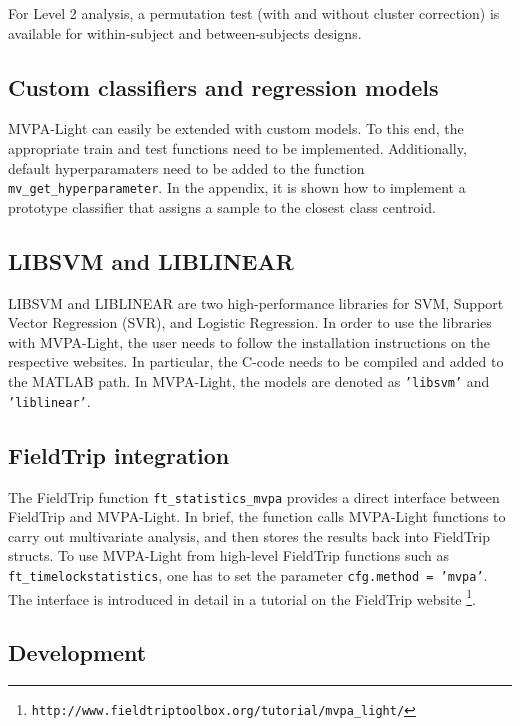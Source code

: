 \documentclass[utf8]{frontiersSCNS} %
\newcommand{\ttt}[1]{\texttt{#1}}
\begin{document}
For Level 2 analysis, a permutation test (with and without cluster correction) is available for within-subject and between-subjects designs.

\subsection{Custom classifiers and regression models}

MVPA-Light can easily be extended with custom models. To this end, the appropriate train and test functions need to be implemented. Additionally, default hyperparamaters need to be added to the function \ttt{mv\_get\_hyperparameter}. In the appendix, it is shown how to implement a prototype classifier that assigns a sample to the closest class centroid.

\subsection{LIBSVM and LIBLINEAR}\label{sec:libsvm}

LIBSVM \citep{Chang2011LIBSVM:Machines} and LIBLINEAR \citep{Fan2008} are two high-performance libraries for SVM, Support Vector Regression (SVR), and Logistic Regression. In order to use the libraries with MVPA-Light, the user needs to follow the installation instructions on the respective websites. In particular, the C-code needs to be compiled and added to the MATLAB path. In MVPA-Light, the models are denoted as \ttt{'libsvm'} and \ttt{'liblinear'}.

\subsection{FieldTrip integration}

The FieldTrip \citep{Oostenveld2011} function \ttt{ft\_statistics\_mvpa} provides a direct interface between FieldTrip and MVPA-Light. In brief, the function calls MVPA-Light functions to carry out multivariate analysis, and then stores the results back into FieldTrip structs. To use MVPA-Light from high-level FieldTrip functions such as \ttt{ft\_timelockstatistics}, one has to set the parameter \ttt{cfg.method = 'mvpa'}. The interface is introduced in detail in a tutorial on the FieldTrip website \footnote{\ttt{http://www.fieldtriptoolbox.org/tutorial/mvpa\_light/}}.

\subsection{Development}\label{sec:development}
\end{document}
